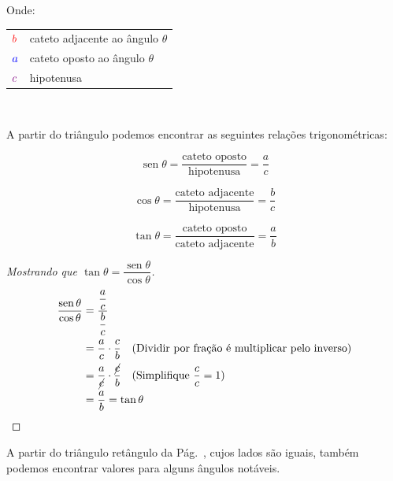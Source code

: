 \documentclass[12pt,openright,twoside,a4paper]{article}
\makeatletter
\theoremstyle{definition}
\renewcommand{\sin}{\operatorname{sen}} %
\newenvironment{condicoes}[1][Onde:]
{#1 \begin{tabular}[t]{>{$}l<{$} @{${} \implies {}$} l}}
	{\end{tabular}\\[\belowdisplayskip]}
\makeatother
\begin{document}
	\begin{condicoes}
		\textcolor{red}{b} & cateto adjacente ao ângulo $\theta$\\
		\textcolor{blue}{a} & cateto oposto ao ângulo $\theta$\\
		\textcolor{violet}{c} & hipotenusa
	\end{condicoes}
	
	A partir do triângulo podemos encontrar as seguintes relações trigonométricas:
	
	\begin{equation}
		\boxed{\sin{\theta} = \dfrac{\text{cateto oposto}}{\text{hipotenusa}} = \dfrac{a}{c}}
	\end{equation}
	
	\begin{equation}
		\boxed{\cos{\theta} = \dfrac{\text{cateto adjacente}}{\text{hipotenusa}} = \dfrac{b}{c}}
	\end{equation}
	
	\begin{equation}
		\boxed{\tan{\theta} = \dfrac{\text{cateto oposto}}{\text{cateto adjacente}} = \dfrac{a}{b}}
	\end{equation}
	
	\begin{proof}[Mostrando que $\tan{\theta} = \displaystyle \dfrac{\sin{\theta}}{\cos{\theta}}$]
		
		\begin{align*}
			\dfrac{\sin{\theta}}{\cos{\theta}} &= \displaystyle \dfrac{\displaystyle \dfrac{a}{c}}{\displaystyle \dfrac{b}{c}}\\
			&= \displaystyle \dfrac{a}{c} \cdot \dfrac{c}{b} \quad \text{(Dividir por fração é multiplicar pelo inverso)}\\
			&= \displaystyle \dfrac{a}{{\cancel{c}}} \cdot \dfrac{{\cancel{c}}}{b} \quad \text{(Simplifique $\dfrac{c}{c} = 1$)}\\
			&= \dfrac{a}{b} = \tan{\theta} \qedhere
		\end{align*}
	\end{proof}
	
	A partir do triângulo retângulo da Pág.~\pageref{fig:triangulo_retangulo}, cujos lados são iguais, também podemos encontrar valores para alguns ângulos notáveis.
	
\end{document}
